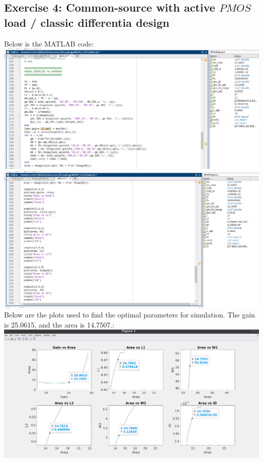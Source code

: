 \documentclass[12pt, fleqn]{article}
\begin{document}
\subsection{Exercise 4: Common-source with active $PMOS$ load / classic differentia design}
Below is the MATLAB code:\\[0.25cm]
\includegraphics[scale=0.35, center]{mat_res6.PNG}\\[0.25cm]
\includegraphics[scale=0.35, center]{mat_res7.PNG}\\[0.25cm]
\newpage
Below are the plots used to find the optimal parameters for simulation.  The gain is 25.0615, and the area is 14.7507.:\\[0.25cm]
\includegraphics[scale=0.275, center]{mat_res8.PNG}\\[0.25cm]
\end{document}
